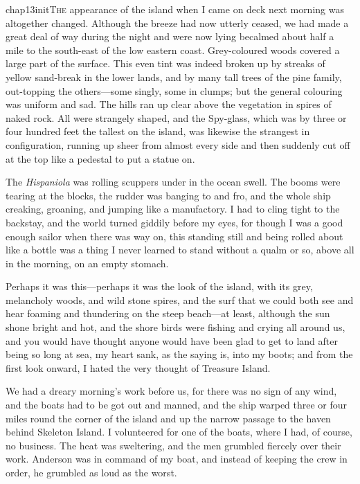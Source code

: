 
\lettrine{chap13initT}{he} appearance of the island when I came on deck next morning was altogether changed. Although the breeze had now utterly ceased, we had made a great deal of way during the night and were now lying becalmed about half a mile to the south-east of the low eastern coast. Grey-coloured woods covered a large part of the surface. This even tint was indeed broken up by streaks of yellow sand-break in the lower lands, and by many tall trees of the pine family, out-topping the others—some singly, some in clumps; but the general colouring was uniform and sad. The hills ran up clear above the vegetation in spires of naked rock. All were strangely shaped, and the Spy-glass, which was by three or four hundred feet the tallest on the island, was likewise the strangest in configuration, running up sheer from almost every side and then suddenly cut off at the top like a pedestal to put a statue on.

The \textit{Hispaniola} was rolling scuppers under in the ocean swell. The booms were tearing at the blocks, the rudder was banging to and fro, and the whole ship creaking, groaning, and jumping like a manufactory. I had to cling tight to the backstay, and the world turned giddily before my eyes, for though I was a good enough sailor when there was way on, this standing still and being rolled about like a bottle was a thing I never learned to stand without a qualm or so, above all in the morning, on an empty stomach.

Perhaps it was this—perhaps it was the look of the island, with its grey, melancholy woods, and wild stone spires, and the surf that we could both see and hear foaming and thundering on the steep beach—at least, although the sun shone bright and hot, and the shore birds were fishing and crying all around us, and you would have thought anyone would have been glad to get to land after being so long at sea, my heart sank, as the saying is, into my boots; and from the first look onward, I hated the very thought of Treasure Island.

We had a dreary morning's work before us, for there was no sign of any wind, and the boats had to be got out and manned, and the ship warped three or four miles round the corner of the island and up the narrow passage to the haven behind Skeleton Island. I volunteered for one of the boats, where I had, of course, no business. The heat was sweltering, and the men grumbled fiercely over their work. Anderson was in command of my boat, and instead of keeping the crew in order, he grumbled as loud as the worst.

